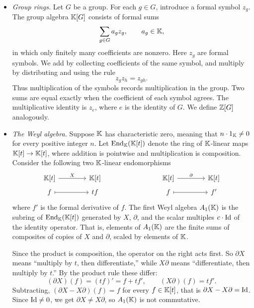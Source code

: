 \documentclass[Notebook.tex]{subfiles}
\begin{document}
\begin{itemize}
	\item \emph{Group rings.} Let $G$ be a group. For each $g\in G$, introduce a formal symbol $z_g$. The group algebra $\mathbb K[G]$ consists of formal sums
	\[
	\sum_{g\in G}a_g z_g,
	\qquad a_g\in\mathbb K,
	\]
	in which only finitely many coefficients are nonzero. Here $z_g$ are formal symbols. We add by collecting coefficients of the same symbol, and multiply by distributing and using the rule
	\[
	z_gz_h=z_{gh}.
	\]
	Thus multiplication of the symbols records multiplication in the group. Two sums are equal exactly when the coefficient of each symbol agrees. The multiplicative identity is $z_e$, where $e$ is the identity of $G$. We define $\mathbb Z[G]$ analogously.

	\item \emph{The Weyl algebra.} Suppose $\mathbb K$ has characteristic zero, meaning that $n\cdot 1_\mathbb K\ne 0$ for every positive integer $n$. Let $\operatorname{End}_\mathbb K(\mathbb K[t])$ denote the ring of $\mathbb K$-linear maps $\mathbb K[t]\to\mathbb K[t]$, where addition is pointwise and multiplication is composition. Consider the following two $\mathbb K$-linear endomorphisms
	\[
	\begin{tikzcd}[row sep = .3em, column sep = 4em]
		\K[t] \arrow[r, "X"]  &\K[t]  & & \K[t] \arrow[r, "\partial"] & \K[t]\\
		f \arrow[r, mapsto] & tf & & f \arrow[r,mapsto] & f'
	\end{tikzcd}
	\]
	where $f'$ is the formal derivative of $f$. The first Weyl algebra $A_1(\mathbb K)$ is the subring of $\operatorname{End}_\mathbb K(\mathbb K[t])$ generated by $X$, $\partial$, and the scalar multiples $c\cdot\operatorname{Id}$ of the identity operator. That is, elements of $A_1(\mathbb K)$ are the finite sums of composites of copies of $X$ and $\partial$, scaled by elements of $\mathbb K$.

	Since the product is composition, the operator on the right acts first. So $\partial X$ means ``multiply by $t$, then differentiate,'' while $X\partial$ means ``differentiate, then multiply by $t$.'' By the product rule these differ:
	\[
	(\partial X)(f)=(tf)'=f+tf',
	\qquad
	(X\partial)(f)=tf'.
	\]
	Subtracting, $(\partial X-X\partial)(f)=f$ for every $f\in\mathbb K[t]$, that is $\partial X-X\partial=\operatorname{Id}$. Since $\operatorname{Id}\ne 0$, we get $\partial X\ne X\partial$, so $A_1(\mathbb K)$ is not commutative.
\end{itemize}

\hrulefill
\end{document}
